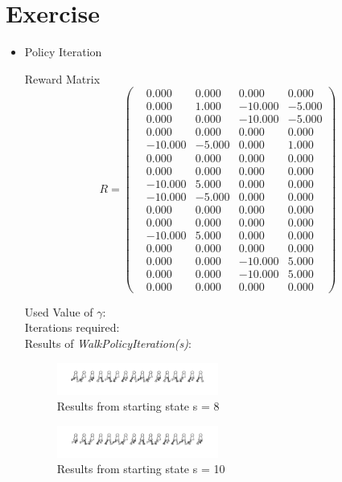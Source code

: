 \documentclass[conference]{IEEEtran}
\begin{document}
\section{Exercise}
\begin{itemize}

\item Policy Iteration

Reward Matrix
$$
R =
 \begin{pmatrix}
 &0.000 &0.000 &0.000 &0.000\\
 &0.000 &1.000 &-10.000 &-5.000\\
 &0.000 &0.000 &-10.000 &-5.000\\
 &0.000 &0.000 &0.000 &0.000\\
 &-10.000 &-5.000 &0.000 &1.000\\
 &0.000 &0.000 &0.000 &0.000\\
 &0.000 &0.000 &0.000 &0.000\\
 &-10.000 &5.000 &0.000 &0.000\\
 &-10.000 &-5.000 &0.000 &0.000\\
 &0.000 &0.000 &0.000 &0.000\\
 &0.000 &0.000 &0.000 &0.000\\
 &-10.000 &5.000 &0.000 &0.000\\
 &0.000 &0.000 &0.000 &0.000\\
 &0.000 &0.000 &-10.000 &5.000\\
 &0.000 &0.000 &-10.000 &5.000\\
 &0.000 &0.000 &0.000 &0.000
 \end{pmatrix}
$$

Used Value of $\gamma$: \\

Iterations required: \\

Results of \textit{WalkPolicyIteration(s)}:

\begin{figure}[h!]
  	\centering
    \includegraphics[width=0.5\textwidth]{img/3walkshow8.png}
    \caption{Results from starting state s = 8}
    \label{fig:3walkshow8}
\end{figure}

\begin{figure}[h!]
  	\centering
    \includegraphics[width=0.5\textwidth]{img/3walkshow10.png}
    \caption{Results from starting state s = 10}
    \label{fig:3walkshow10}
\end{figure}


\end{itemize}
\end{document}

